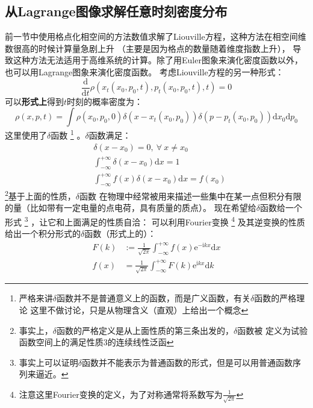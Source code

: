     \subsection{从Lagrange图像求解任意时刻密度分布}
    前一节中使用格点化相空间的方法数值求解了Liouville方程，这种方法在相空间维数很高的时候计算量急剧上升
    （主要是因为格点的数量随着维度指数上升），
    导致这种方法无法适用于高维系统的计算。除了用Euler图象来演化密度函数以外，也可以用Lagrange图象来演化密度函数。
    考虑Liouville方程的另一种形式：
    \begin{equation}
        \frac {\mathrm{d}}{\mathrm{d}t} \rho(x_t(x_0, p_0, t),p_t(x_0, p_0, t),t) = 0
    \end{equation}
    可以\textbf{形式上}得到$t$时刻的概率密度为：
    \begin{equation}
        \rho(x,p,t) = \int \rho(x_0,p_0,0)\delta(x-x_t(x_0,p_0)) \delta(p-p_t(x_0,p_0)) \mathrm{d}x_0\mathrm{d}p_0
        \label{formal solution}
    \end{equation}
    这里使用了$\delta$函数
    \footnote{
        严格来讲$\delta$函数并不是普通意义上的函数，而是广义函数，有关$\delta$函数的严格理论
        这里不做讨论，只是从物理含义（直观）上给出一个概念
    }
    。$\delta$函数满足：
    \begin{equation}
        \begin{split}
        &\delta(x-x_0) = 0, \ \forall \ x \neq x_0\\
        &\int_{-\infty}^{+\infty} \delta(x-x_0) \mathrm{d}x = 1\\
        &\int_{-\infty}^{+\infty} f(x)\delta(x-x_0) \mathrm{d}x = f(x_0)
        \end{split}
        \label{delta function}
    \end{equation}
    \footnote{事实上，$\delta$函数的严格定义是从上面性质的第三条出发的，$\delta$函数被
    定义为试验函数空间上的满足性质3的连续线性泛函}基于上面的性质，$\delta$函数
    在物理中经常被用来描述一些集中在某一点但积分有限的量（比如带有一定电量的点电荷，具有质量的质点）。
    现在希望给$\delta$函数给一个形式
    \footnote{
        事实上可以证明$\delta$函数并不能表示为普通函数的形式，但是可以用普通函数序列来逼近。
    }
    ，让它和上面满足的性质自洽：
    可以利用Fourier变换
    \footnote{注意这里Fourier变换的定义，为了对称通常将系数写为$\frac{1}{\sqrt{2\pi}}$}
    及其逆变换的性质给出一个积分形式的$\delta$函数（形式上的）：
    \begin{equation}
        \begin{split}
            F(k) &:= \frac 1{\sqrt{2\pi}} \int_{-\infty}^{+\infty} f(x)\mathrm{e}^{-\mathrm{i}kx}\mathrm{d}x\\
            f(x) &= \frac 1{\sqrt{2\pi}} \int_{-\infty}^{+\infty} F(k)\mathrm{e}^{\mathrm{i}kx}\mathrm{d}k
        \end{split}
        \label{fourier transform}
    \end{equation}
